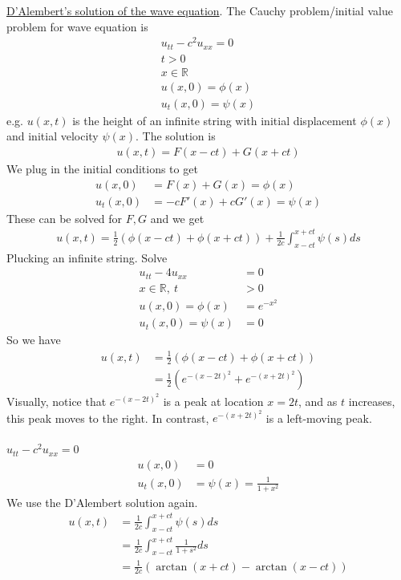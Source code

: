 \documentclass[12pt, letterpaper]{article}
\begin{document}
\underline{D'Alembert's solution of the wave equation}. The Cauchy problem/initial value problem 
for wave equation is 
\begin{align*}
    u_{tt} - c^2u_{xx} = 0 \\
    t > 0 \\
    x\in \mathbb{R} \\
    u(x,0) = \phi(x) \\
    u_t(x,0) = \psi(x)
\end{align*}
e.g. $u(x,t)$ is the height of an infinite string with initial displacement $\phi(x)$ and 
initial velocity $\psi(x)$. The solution is 
\begin{align*}
    u(x,t) = F(x-ct) + G(x+ct)
\end{align*}
We plug in the initial conditions to get
\begin{align*}
    u(x,0) &= F(x) + G(x) = \phi(x) \\
    u_t(x,0) &= -cF'(x) + cG'(x) = \psi(x)
\end{align*}
These can be solved for $F,G$ and we get 
\begin{align*}
    u(x,t) = \frac 12 (\phi(x-ct) + \phi(x+ct)) + \frac{1}{2c}\int_{x-ct}^{x+ct} \psi(s)ds
\end{align*}
 Plucking an infinite string. Solve 
\begin{align*}
    u_{tt} - 4 u_{xx} &= 0 \\
    x \in \mathbb{R},\ t &> 0 \\
    u(x,0) = \phi(x) &= e^{-x^2} \\
    u_t(x,0) = \psi(x) &= 0
\end{align*}
So we have 
\begin{align*}
    u(x,t) &= \frac{1}{2}(\phi(x-ct) + \phi(x+ct)) \\
    &= \frac 12 (e^{-(x-2t)^2} + e^{-(x+2t)^2})
\end{align*}
Visually, notice that $e^{-(x-2t)^2}$ is a peak at location $x = 2t$, and as $t$ increases, 
this peak moves to the right. In contrast, $e^{-(x+2t)^2}$ is a left-moving peak. \\ \\ 
 $u_{tt} - c^2u_{xx} = 0$
\begin{align*}
    u(x,0) &= 0 \\
    u_t(x,0) &= \psi(x) = \frac{1}{1+x^2}
\end{align*}
We use the D'Alembert solution again.
\begin{align*}
    u(x,t) &= \frac{1}{2c}\int_{x-ct}^{x+ct}\psi(s)ds \\
    &= \frac{1}{2c} \int_{x-ct}^{x+ct} \frac{1}{1+s^2}ds \\
    &= \frac{1}{2c} (\arctan(x+ct) - \arctan(x-ct))
\end{align*}
\end{document}
